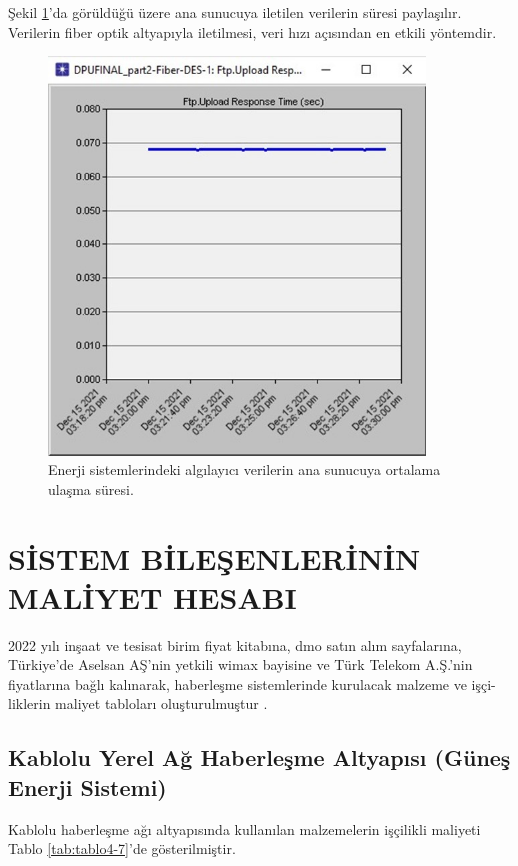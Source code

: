 Şekil \ref{fig:4-40}’da görüldüğü üzere ana sunucuya iletilen verilerin süresi paylaşılır. Verilerin fiber optik altyapıyla iletilmesi, veri hızı açısından en etkili yöntemdir.

\begin{figure}[htbp]
\centerline{\includegraphics[width=10cm]{Resim/sekil4-38.jpg}}
\caption{Enerji sistemlerindeki algılayıcı verilerin ana sunucuya ortalama ulaşma süresi.}
\label{fig:4-40}
\end{figure}

\section{SİSTEM BİLEŞENLERİNİN MALİYET HESABI}

2022 yılı inşaat ve tesisat birim fiyat kitabına, \gls{dmo} satın alım sayfalarına, Türkiye’de Aselsan AŞ’nin yetkili \gls{wimax} bayisine ve Türk Telekom A.Ş.’nin fiyatlarına bağlı kalınarak, haberleşme sistemlerinde kurulacak malzeme ve işçi-liklerin maliyet tabloları oluşturulmuştur \cite{birimfiyat}.




\subsection{Kablolu Yerel Ağ Haberleşme Altyapısı (Güneş Enerji Sistemi)}


Kablolu haberleşme ağı altyapısında kullanılan malzemelerin işçilikli maliyeti Tablo \ref{tab:tablo4-7}’de gösterilmiştir.

